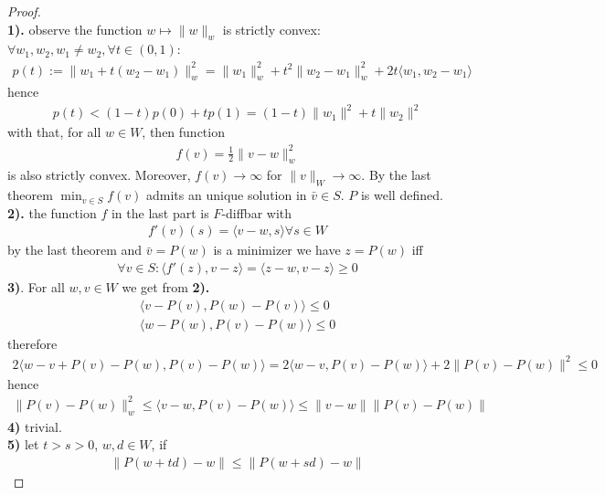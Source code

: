 \documentclass[a4paper,11pt,fleqn]{book}
\theoremstyle{definition}
\theoremstyle{remark}
\begin{document}
\begin{proof}
	\qquad\\
	\textbf{1).} observe the function $w \mapsto \|w\|_w$ is strictly convex: $\forall w_1, w_2, w_1 \neq w_2, \forall t \in (0, 1):$
	\begin{align*}
		p(t):= \|w_1 + t(w_2 - w_1)\|_w^2 = \|w_1\|_w^2 + t^2\|w_2 - w_1\|^2_w+ 2t\langle w_1, w_2 - w_1\rangle
	\end{align*}
	hence
	\begin{align*}
		p(t) < (1 - t) p(0) +  t p(1) = (1 - t) \|w_1\|^2 + t \|w_2\|^2
	\end{align*}
	with that, for all $w \in W$, then function
	\begin{align*}
		f(v) = \frac{1}{2}\|v - w\|_w^2
	\end{align*}
	is also strictly convex. Moreover, $f(v) \rightarrow \infty$ for $\|v\|_W \rightarrow \infty$. By the last theorem $\min_{v \in S} f(v)$ admits an unique solution in $\bar{v} \in S$. $P$ is well defined. \\
	\textbf{2).} the function $f$ in the last part is $F$-diffbar with
	\begin{align*}
		f'(v)(s) = \langle v - w, s \rangle \forall s \in W
	\end{align*}
	by the last theorem and $\bar{v} = P(w)$ is a minimizer we have $z = P(w)$ iff
	\begin{align*}
		\forall v \in S:
		\langle f'(z), v - z \rangle = \langle z - w, v - z \rangle \geq 0
	\end{align*}
	\textbf{3)}. For all $w, v \in W$ we get from \textbf{2).}
	\begin{align*}
		\langle v - P(v), P(w) - P(v) \rangle \le 0\\
		\langle w - P(w), P(v) - P(w) \rangle \le 0
	\end{align*}
	therefore
	\begin{align*}
		2 \langle w - v + P(v) - P(w), P(v) - P(w) \rangle
		= 2 \langle w - v, P(v) - P(w) \rangle + 2\|P(v) - P(w)\|^2  \le 0
	\end{align*}
	hence 
	\begin{align*}
		\|P(v) - P(w) \|_w^2 \le \langle v - w, P(v) - P(w) \rangle
		\le \|v - w\| \|P(v) - P(w)\|
	\end{align*}
	\textbf{4)} trivial.\\
	\textbf{5)} let $ t > s > 0$, $w , d \in W$, if 
	\begin{align*}
		\|P(w + td) - w\| \le \|P(w + sd) - w\|
	\end{align*}

\end{proof}
\end{document}
